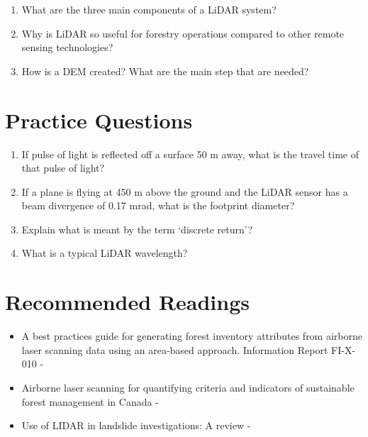 \documentclass[
]{book}
\providecommand{\tightlist}{%
  \setlength{\itemsep}{0pt}\setlength{\parskip}{0pt}}
\begin{document}
\begin{enumerate}
\def\labelenumi{\arabic{enumi}.}
\tightlist
\item
  What are the three main components of a LiDAR system?
\item
  Why is LiDAR so useful for forestry operations compared to other remote sensing technologies?
\item
  How is a DEM created? What are the main step that are needed?
\end{enumerate}

\section*{Practice Questions}\label{practice-questions-5}

\begin{enumerate}
\def\labelenumi{\arabic{enumi}.}
\tightlist
\item
  If pulse of light is reflected off a surface 50 m away, what is the travel time of that pulse of light?
\item
  If a plane is flying at 450 m above the ground and the LiDAR sensor has a beam divergence of 0.17 mrad, what is the footprint diameter?
\item
  Explain what is meant by the term `discrete return'?
\item
  What is a typical LiDAR wavelength?
\end{enumerate}

\section*{Recommended Readings}\label{recommended-readings-1}

\begin{itemize}
\tightlist
\item
  A best practices guide for generating forest inventory attributes from airborne laser scanning data using an area-based approach. Information Report FI-X-010 - \citet{white_best_2013}
\item
  Airborne laser scanning for quantifying criteria and indicators of sustainable forest management in Canada - \citet{goodbody_airborne_2021}
\item
  Use of LIDAR in landslide investigations: A review - \citet{jaboyedoff_use_2012}
\end{itemize}

  
\end{document}

